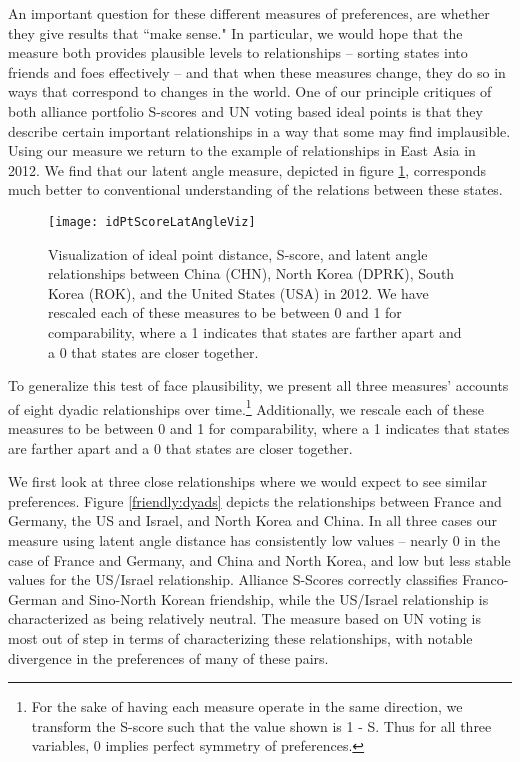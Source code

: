 An important question for these different measures of preferences, are whether they give results that ``make sense." In particular, we would hope that the measure both provides plausible levels to relationships -- sorting states into friends and foes effectively -- and that when these measures change, they do so in ways that correspond to changes in the world. One of our principle critiques of both alliance portfolio S-scores and UN voting based ideal points is that they describe certain important relationships in a way that some may find implausible. Using our measure we return to the example of relationships in East Asia in 2012. We find that our latent angle measure, depicted in figure \ref{korea:withus}, corresponds much better to conventional understanding of the relations between these states.

\begin{figure}[ht]
\texttt{[image: idPtScoreLatAngleViz]}
\caption{Visualization of ideal point distance, S-score, and latent angle relationships between China (CHN), North Korea (DPRK), South Korea (ROK), and the United States (USA) in 2012. We have rescaled each of these measures to be between 0 and 1 for comparability, where a 1 indicates that states are farther apart and a 0 that states are closer together.}
\label{korea:withus}
\end{figure}

To generalize this test of face plausibility, we present all three measures' accounts of eight dyadic relationships over time.\footnote{For the sake of having each measure operate in the same direction, we transform the S-score such that the value shown is 1 - S. Thus for all three variables, $0$ implies perfect symmetry of preferences.} Additionally, we rescale each of these measures to be between 0 and 1 for comparability, where a 1 indicates that states are farther apart and a 0 that states are closer together.

We first look at three close relationships where we would expect to see similar preferences. Figure \ref{friendly:dyads} depicts the relationships between France and Germany, the US and Israel, and North Korea and China. In all three cases our measure using latent angle distance has consistently low values -- nearly $0$ in the case of France and Germany, and China and North Korea, and low but less stable values for the US/Israel relationship. Alliance S-Scores correctly classifies Franco-German and Sino-North Korean friendship, while the US/Israel relationship is characterized as being relatively neutral. The measure based on UN voting is most out of step in terms of characterizing these relationships, with notable divergence in the preferences of many of these pairs.

